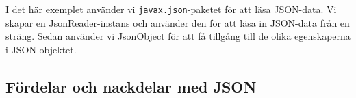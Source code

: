 \hypertarget{cb4}{}
\begin{Shaded}
\begin{Highlighting}[]
 \OperatorTok{;}
 \OperatorTok{;}
 \OperatorTok{;}
 \OperatorTok{;}

\OperatorTok{=} \StringTok{:}\StringTok{,}\OperatorTok{;}

\OperatorTok{=}\OperatorTok{(} \OperatorTok{(}\OperatorTok{));}
\OperatorTok{=}\OperatorTok{();}
\OperatorTok{=}\OperatorTok{(}\OperatorTok{);}
\OperatorTok{=}\OperatorTok{(}\OperatorTok{);}

\OperatorTok{(}\OperatorTok{);} 
\OperatorTok{(}\OperatorTok{);} 
\end{Highlighting}
\end{Shaded}

I det här exemplet använder vi \texttt{javax.json}-paketet för att läsa
JSON-data. Vi skapar en JsonReader-instans och använder den för att läsa
in JSON-data från en sträng. Sedan använder vi JsonObject för att få
tillgång till de olika egenskaperna i JSON-objektet.

\hypertarget{fuxf6rdelar-och-nackdelar-med-json}{%
\subsection{Fördelar och nackdelar med
JSON}\label{fuxf6rdelar-och-nackdelar-med-json}}

